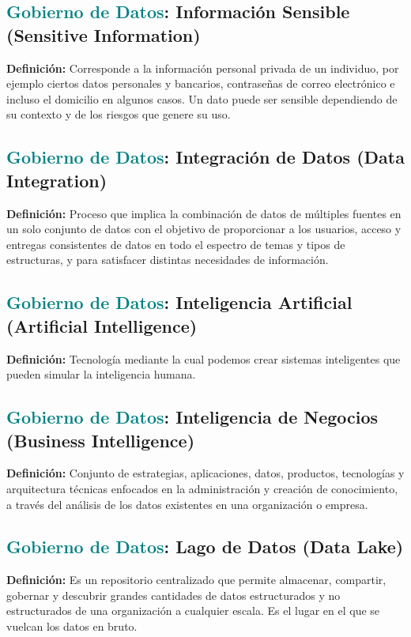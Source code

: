 \documentclass[12pt]{article}
\begin{document}
\subsection{\textcolor{teal}{Gobierno de Datos}: Información Sensible (Sensitive Information)}
\textbf{Definición:} Corresponde a la información personal privada de un individuo, por ejemplo ciertos datos personales y bancarios, contraseñas de correo electrónico e incluso el domicilio en algunos casos. Un dato puede ser sensible dependiendo de su contexto y de los riesgos que genere su uso.
\subsection{\textcolor{teal}{Gobierno de Datos}: Integración de Datos (Data Integration)}
\textbf{Definición:} Proceso que implica la combinación de datos de múltiples fuentes en un solo conjunto de datos con el objetivo de proporcionar a los usuarios, acceso y entregas consistentes de datos en todo el espectro de temas y tipos de estructuras, y para satisfacer distintas necesidades de información.
\subsection{\textcolor{teal}{Gobierno de Datos}: Inteligencia Artificial (Artificial Intelligence)}
\textbf{Definición:} Tecnología mediante la cual podemos crear sistemas inteligentes que pueden simular la inteligencia humana.
\subsection{\textcolor{teal}{Gobierno de Datos}: Inteligencia de Negocios (Business Intelligence) }
\textbf{Definición:} Conjunto de estrategias, aplicaciones, datos, productos, tecnologías y arquitectura técnicas enfocados en la administración y creación de conocimiento, a través del análisis de los datos existentes en una organización o empresa.
\subsection{\textcolor{teal}{Gobierno de Datos}: Lago de Datos (Data Lake)}
\textbf{Definición:} Es un repositorio centralizado que permite almacenar, compartir, gobernar y descubrir grandes cantidades de datos estructurados y no estructurados de una organización a cualquier escala. Es el lugar en el que se vuelcan los datos en bruto.
\end{document}
